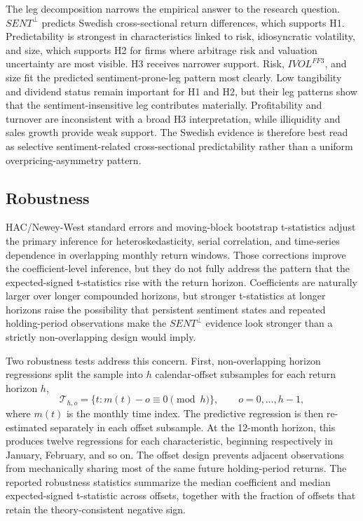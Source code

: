 \documentclass[11pt]{article}
\newcommand{\var}[1]{\ensuremath{#1}}
\begin{document}
The leg decomposition narrows the empirical answer to the research question. \var{SENT^{\perp}} predicts Swedish cross-sectional return differences, which supports H1. Predictability is strongest in characteristics linked to risk, idiosyncratic volatility, and size, which supports H2 for firms where arbitrage risk and valuation uncertainty are most visible. H3 receives narrower support. Risk, \var{IVOL^{FF3}}, and size fit the predicted sentiment-prone-leg pattern most clearly. Low tangibility and dividend status remain important for H1 and H2, but their leg patterns show that the sentiment-insensitive leg contributes materially. Profitability and turnover are inconsistent with a broad H3 interpretation, while illiquidity and sales growth provide weak support. The Swedish evidence is therefore best read as selective sentiment-related cross-sectional predictability rather than a uniform overpricing-asymmetry pattern.

\subsection{Robustness}
HAC/Newey-West standard errors and moving-block bootstrap t-statistics adjust the primary inference for heteroskedasticity, serial correlation, and time-series dependence in overlapping monthly return windows. Those corrections improve the coefficient-level inference, but they do not fully address the pattern that the expected-signed t-statistics rise with the return horizon. Coefficients are naturally larger over longer compounded horizons, but stronger t-statistics at longer horizons raise the possibility that persistent sentiment states and repeated holding-period observations make the \var{SENT^{\perp}} evidence look stronger than a strictly non-overlapping design would imply.

Two robustness tests address this concern. First, non-overlapping horizon regressions split the sample into \var{h} calendar-offset subsamples for each return horizon \var{h},
\begin{equation}
    \mathcal{T}_{h,o}=\{t: m(t)-o \equiv 0 \pmod h\}, \qquad o=0,\ldots,h-1,
\end{equation}
where \var{m(t)} is the monthly time index. The predictive regression is then re-estimated separately in each offset subsample. At the 12-month horizon, this produces twelve regressions for each characteristic, beginning respectively in January, February, and so on. The offset design prevents adjacent observations from mechanically sharing most of the same future holding-period returns. The reported robustness statistics summarize the median coefficient and median expected-signed t-statistic across offsets, together with the fraction of offsets that retain the theory-consistent negative sign.
\end{document}
